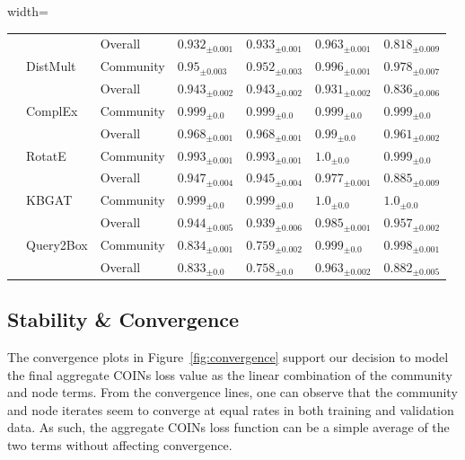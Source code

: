 \begin{table}[hb!]
\begin{adjustbox}{width=\textwidth}
\begin{tabular}{lllllll}
         &           & Overall &  ${{0.932}_{\pm 0.001}}$ &  ${{0.933}_{\pm 0.001}}$ &  ${{0.963}_{\pm 0.001}}$ &  ${{0.818}_{\pm 0.009}}$ \\
         & DistMult & Community &   ${{0.95}_{\pm 0.003}}$ &  ${{0.952}_{\pm 0.003}}$ &  ${{0.996}_{\pm 0.001}}$ &  ${{0.978}_{\pm 0.007}}$ \\
         &           & Overall &  ${{0.943}_{\pm 0.002}}$ &  ${{0.943}_{\pm 0.002}}$ &  ${{0.931}_{\pm 0.002}}$ &  ${{0.836}_{\pm 0.006}}$ \\
         & ComplEx & Community &    ${{0.999}_{\pm 0.0}}$ &    ${{0.999}_{\pm 0.0}}$ &    ${{0.999}_{\pm 0.0}}$ &    ${{0.999}_{\pm 0.0}}$ \\
         &           & Overall &  ${{0.968}_{\pm 0.001}}$ &  ${{0.968}_{\pm 0.001}}$ &     ${{0.99}_{\pm 0.0}}$ &  ${{0.961}_{\pm 0.002}}$ \\
         & RotatE & Community &  ${{0.993}_{\pm 0.001}}$ &  ${{0.993}_{\pm 0.001}}$ &      ${{1.0}_{\pm 0.0}}$ &    ${{0.999}_{\pm 0.0}}$ \\
         &           & Overall &  ${{0.947}_{\pm 0.004}}$ &  ${{0.945}_{\pm 0.004}}$ &  ${{0.977}_{\pm 0.001}}$ &  ${{0.885}_{\pm 0.009}}$ \\
         & KBGAT & Community &    ${{0.999}_{\pm 0.0}}$ &    ${{0.999}_{\pm 0.0}}$ &      ${{1.0}_{\pm 0.0}}$ &      ${{1.0}_{\pm 0.0}}$ \\
         &           & Overall &  ${{0.944}_{\pm 0.005}}$ &  ${{0.939}_{\pm 0.006}}$ &  ${{0.985}_{\pm 0.001}}$ &  ${{0.957}_{\pm 0.002}}$ \\
         & Query2Box & Community &  ${{0.834}_{\pm 0.001}}$ &  ${{0.759}_{\pm 0.002}}$ &    ${{0.999}_{\pm 0.0}}$ &  ${{0.998}_{\pm 0.001}}$ \\
         &           & Overall &    ${{0.833}_{\pm 0.0}}$ &    ${{0.758}_{\pm 0.0}}$ &  ${{0.963}_{\pm 0.002}}$ &  ${{0.882}_{\pm 0.005}}$ \\
\bottomrule
\end{tabular}
  \end{adjustbox}
\end{table}%

\subsection{Stability \& Convergence}

The convergence plots in Figure~\ref{fig:convergence} support our decision to model the final aggregate COINs loss value as the linear combination of the community and node terms. From the convergence lines, one can observe that the community and node iterates seem to converge at equal rates in both training and validation data. As such, the aggregate COINs loss function can be a simple average of the two terms without affecting convergence.

